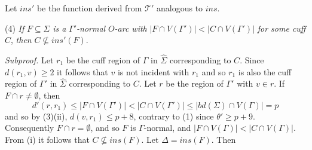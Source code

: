 Let $ins'$ be the function derived from $\mathcal{T}'$ analogous to $ins$.

\hspace*{12pt}(4) \textit{If} $F \subseteq \Sigma$ \textit{is a} $\Gamma'$\textit{-normal} $O$\textit{-arc with} $|F \cap V(\Gamma')| < |C \cap V(\Gamma')|$ \textit{for some cuff} $C$, \textit{then} $C \not\subseteq ins'(F)$.

\textit{Subproof.} Let $r_1$ be the cuff region of $\Gamma$ in $\hat{\Sigma}$ corresponding to $C$. Since $d(r_1, v) \ge 2$ it follows that $v$ is not incident with $r_1$ and so $r_1$ is also the cuff region of $\Gamma'$ in $\hat{\Sigma}$ corresponding to $C$. Let $r$ be the region of $\Gamma'$ with $v \in r$. If $F \cap r \ne \emptyset$, then
\begin{equation*}
d'(r, r_1) \le |F \cap V(\Gamma')| < |C \cap V(\Gamma')| \le |bd(\Sigma) \cap V(\Gamma)| = p
\end{equation*}
and so by (3)(ii), $d(v, r_1) \le p+8$, contrary to (1) since $\theta' \ge p+9$. Consequently $F \cap r = \emptyset$, and so $F$ is $\Gamma$-normal, and $|F \cap V(\Gamma)| < |C \cap V(\Gamma)|$. From (i) it follows that $C \not\subseteq ins(F)$. Let $\Delta = ins(F)$. Then
